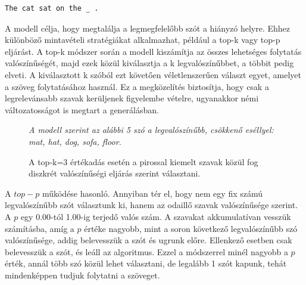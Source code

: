 \documentclass[12pt]{report}
\theoremstyle{definition}
\begin{document}
\begin{verbatim}
The cat sat on the _ .
\end{verbatim}
A modell célja, hogy megtalálja a legmegfelelőbb szót a hiányzó helyre. Ehhez különböző mintavételi stratégiákat alkalmazhat, például a top-k vagy top-p eljárást.
A top-k módszer során a modell kiszámítja az összes lehetséges folytatás valószínűségét, majd ezek közül kiválasztja a k legvalószínűbbet, a többit pedig elveti. A kiválasztott k szóból ezt követően véletlenszerűen választ egyet, amelyet a szöveg folytatásához használ. Ez a megközelítés biztosítja, hogy csak a legrelevánsabb szavak kerüljenek figyelembe vételre, ugyanakkor némi változatosságot is megtart a generálásban.

\begin{figure}[htbp]
\centering

\vspace{0.5em}
\small\textit{A modell szerint az alábbi 5 szó a legvalószínűbb, csökkenő eséllyel: mat, hat, dog, sofa, floor.}


\caption{A top-k=3 értékadás esetén a pirossal kiemelt szavak közül fog diszkrét valószínűségi eljárás szerint választani.}
\end{figure}


A $top-p$ működése hasonló. Annyiban tér el, hogy nem egy fix számú legvalószínűbb szót választunk ki, hanem az odaillő szavak valószínűsége szerint. A $p$ egy 0.00-tól 1.00-ig terjedő valós szám. A szavakat akkumulatívan vesszük számításba, amíg a $p$ értéke nagyobb, mint a soron következő legvalószínűbb szó valószínűsége, addig belevesszük a szót és ugrunk előre. Ellenkező esetben csak belevesszük a szót, és leáll az algoritmus. Ezzel a módszerrel minél nagyobb a $p$ érték, annál több szó közül lehet választani, de legalább 1 szót kapunk, tehát mindenképpen tudjuk folytatni a szöveget.
\end{document}
